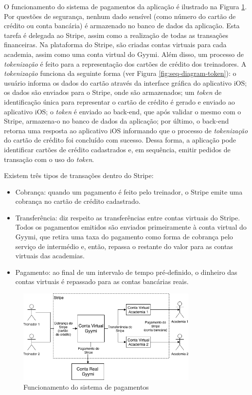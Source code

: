 O funcionamento do sistema de pagamentos da aplicação é ilustrado na Figura \ref{fig:payment-system}. Por questões de segurança, nenhum dado sensível (como número do cartão de crédito ou conta bancária) é armazenado no banco de dados da aplicação. Esta tarefa é delegada ao Stripe, assim como a realização de todas as transações financeiras. Na plataforma do Stripe, são criadas contas virtuais para cada academia, assim como uma conta virtual do Gyymi. Além disso, um processo de \textit{tokenização} é feito para a representação dos cartões de crédito dos treinadores. A \textit{tokenização} funciona da seguinte forma (ver Figura \ref{fig:seq-diagram-token}): o usuário informa os dados do cartão através da interface gráfica do aplicativo iOS; os dados são enviados para o Stripe, onde são armazenados; um \textit{token} de identificação única para representar o cartão de crédito é gerado e enviado ao aplicativo iOS; o \textit{token} é enviado ao back-end, que após validar o mesmo com o Stripe, armazena-o no banco de dados da aplicação; por último, o back-end retorna uma resposta ao aplicativo iOS informando que o processo de \textit{tokenização} do cartão de crédito foi concluído com sucesso. Dessa forma, a aplicação pode identificar cartões de crédito cadastrados e, em sequência, emitir pedidos de transação com o uso do \textit{token}.

Existem três tipos de transações dentro do Stripe:
\begin{itemize}
    \item Cobrança: quando um pagamento é feito pelo treinador, o Stripe emite uma cobrança no cartão de crédito cadastrado.
    \item Transferência: diz respeito as transferências entre contas virtuais do Stripe. Todos os pagamentos emitidos são enviados primeiramente à conta virtual do Gyymi, que retira uma taxa do pagamento como forma de cobrança pelo serviço de intermédio e, então, repassa o restante do valor para as contas virtuais das academias.
    \item Pagamento: ao final de um intervalo de tempo pré-definido, o dinheiro das contas virtuais é repassado para as contas bancárias reais.
\end{itemize}

\begin{figure}[H]
    \centering
    \includegraphics[width=0.8\textwidth]{pfc/figuras/payment-system-stripe.png}
    \caption{Funcionamento do sistema de pagamentos}
    \label{fig:payment-system}
\end{figure}

